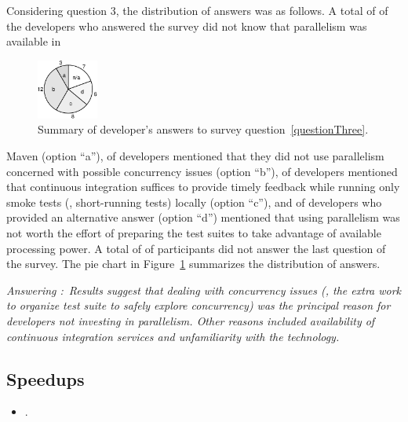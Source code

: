 \documentclass[10pt,journal,compsoc]{IEEEtran}
\begin{document}
Considering question 3, the distribution of answers was as follows.  A
total of \emailsA{} of the \emailsProjectsAnswered{} developers who
answered the survey did not know that parallelism was available in
\begin{figure}
  \centering
  \includegraphics[width=2cm]{results/survey.pdf}
  \caption{\label{fig:rq5-answers}Summary of developer's answers to
    survey question~\ref{questionThree}.}
\end{figure}
Maven (option ``a''), \emailsB{} of developers mentioned that they did
not use parallelism concerned with possible concurrency issues (option
``b''), \emailsD{} of developers mentioned that continuous integration
suffices to provide timely feedback while running only smoke
tests (\ie{}, short-running tests) locally (option ``c''), and \emailsD{} of
developers who provided an alternative answer (option ``d'') mentioned
that using parallelism was not worth the effort of preparing the test
suites to take advantage of available processing power.  A total of
\emailsNA{} of participants did not answer the last question of the
survey.  The pie chart in Figure~\ref{fig:rq5-answers} 
summarizes the distribution of answers.

\begin{mdframed}
\noindent\textit{Answering \numRQAdoptionTwo{}:}~\emph{Results suggest that dealing
  with concurrency issues (\ie{}, the extra work to organize test
  suite to safely explore concurrency) was the principal reason
  for developers not investing in parallelism.  Other reasons
  included availability of continuous integration services and
  unfamiliarity with the technology.}
\end{mdframed}

\subsection{Speedups}
\label{sec:rqD}

\begin{itemize}
    \item \numRQSpeedupOne{}. \textbf{\RQSpeedupOne}
\end{itemize}
\end{document}
